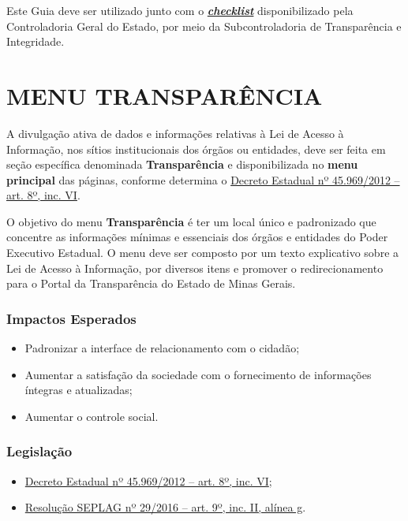 \documentclass[
]{book}
\providecommand{\tightlist}{%
  \setlength{\itemsep}{0pt}\setlength{\parskip}{0pt}}
\begin{document}
Este Guia deve ser utilizado junto com o \textbf{\emph{\href{https://forms.gle/x6rd1aGHzknH8y5m8}{checklist}}} disponibilizado pela Controladoria Geral do Estado, por meio da Subcontroladoria de Transparência e Integridade.

\hypertarget{menu-transparuxeancia}{%
\chapter{MENU TRANSPARÊNCIA}\label{menu-transparuxeancia}}

A divulgação ativa de dados e informações relativas à Lei de Acesso à Informação, nos sítios institucionais dos órgãos ou entidades, deve ser feita em seção específica denominada \textbf{Transparência} e disponibilizada no \textbf{menu principal} das páginas, conforme determina o \href{https://www.almg.gov.br/consulte/legislacao/completa/completa.html?tipo=DEC\&num=45969\&ano=2012}{Decreto Estadual nº 45.969/2012 -- art. 8º, inc. VI}.

O objetivo do menu \textbf{Transparência} é ter um local único e padronizado que concentre as informações mínimas e essenciais dos órgãos e entidades do Poder Executivo Estadual. O menu deve ser composto por um texto explicativo sobre a Lei de Acesso à Informação, por diversos itens e promover o redirecionamento para o Portal da Transparência do Estado de Minas Gerais.

\hypertarget{impactos-esperados}{%
\subsection{Impactos Esperados}\label{impactos-esperados}}

\begin{itemize}
\tightlist
\item
  Padronizar a interface de relacionamento com o cidadão;
\item
  Aumentar a satisfação da sociedade com o fornecimento de informações íntegras e atualizadas;
\item
  Aumentar o controle social.
\end{itemize}

\hypertarget{legislauxe7uxe3o}{%
\subsection{Legislação}\label{legislauxe7uxe3o}}

\begin{itemize}
\tightlist
\item
  \href{https://www.almg.gov.br/consulte/legislacao/completa/completa.html?tipo=DEC\&num=45969\&ano=2012}{Decreto Estadual nº 45.969/2012 -- art. 8º, inc. VI};
\item
  \href{http://www.planejamento.mg.gov.br/sites/default/files/documentos/resolucao_sitios_seplag_29_de_05_07_2016_1.pdf}{Resolução SEPLAG nº 29/2016 -- art. 9º, inc. II, alínea g}.
\end{itemize}
\end{document}
